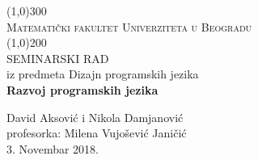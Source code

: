 \documentclass[a4paper]{article}
\begin{document}
\begin{titlepage}
\begin{center}

\line(1,0){300}\\[1cm]
\textsc{ Matematički fakultet Univerziteta u Beogradu}\\ [2mm]
\line(1,0){200}\\[1.5cm]
\huge{ SEMINARSKI RAD\\ iz predmeta Dizajn programskih jezika}
 \\ [3cm]



\huge{\bfseries Razvoj programskih jezika} 
\\[5cm]
\end{center}


	\begin{center}
	David Aksović i Nikola Damjanović\\
	profesorka: Milena Vujošević Janičić\\
	3. Novembar 2018.
	\end{center}
\end{titlepage}
\newpage

\tableofcontents
\newpage
\end{document}
